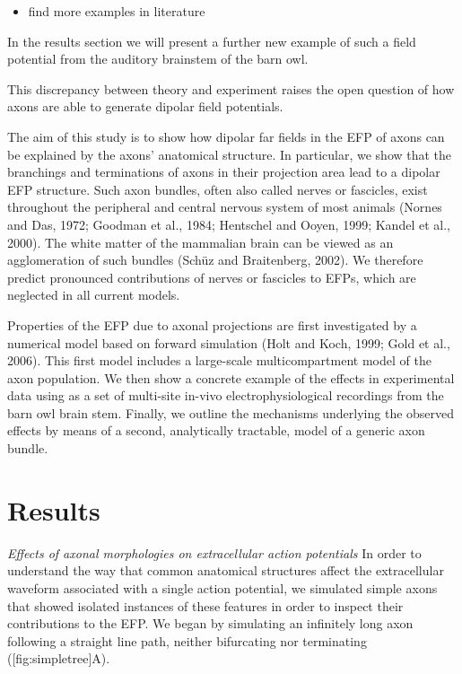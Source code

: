 \documentclass[]{article}
\providecommand{\tightlist}{%
  \setlength{\itemsep}{0pt}\setlength{\parskip}{0pt}}
\begin{document}
\begin{itemize}
\tightlist
\item
  find more examples in literature
\end{itemize}

In the results section we will present a further new example of such a
field potential from the auditory brainstem of the barn owl.

This discrepancy between theory and experiment raises the open question
of how axons are able to generate dipolar field potentials.

The aim of this study is to show how dipolar far fields in the EFP of
axons can be explained by the axons' anatomical structure. In
particular, we show that the branchings and terminations of axons in
their projection area lead to a dipolar EFP structure. Such axon
bundles, often also called nerves or fascicles, exist throughout the
peripheral and central nervous system of most animals (Nornes and Das,
1972; Goodman et al., 1984; Hentschel and Ooyen, 1999; Kandel et al.,
2000). The white matter of the mammalian brain can be viewed as an
agglomeration of such bundles (Schüz and Braitenberg, 2002). We
therefore predict pronounced contributions of nerves or fascicles to
EFPs, which are neglected in all current models.

Properties of the EFP due to axonal projections are first investigated
by a numerical model based on forward simulation (Holt and Koch, 1999;
Gold et al., 2006). This first model includes a large-scale
multicompartment model of the axon population. We then show a concrete
example of the effects in experimental data using as a set of multi-site
in-vivo electrophysiological recordings from the barn owl brain stem.
Finally, we outline the mechanisms underlying the observed effects by
means of a second, analytically tractable, model of a generic axon
bundle.

\section{Results}\label{results}

\emph{Effects of axonal morphologies on extracellular action potentials}
In order to understand the way that common anatomical structures affect
the extracellular waveform associated with a single action potential, we
simulated simple axons that showed isolated instances of these features
in order to inspect their contributions to the EFP. We began by
simulating an infinitely long axon following a straight line path,
neither bifurcating nor terminating ({[}fig:simpletree{]}A).
\end{document}
